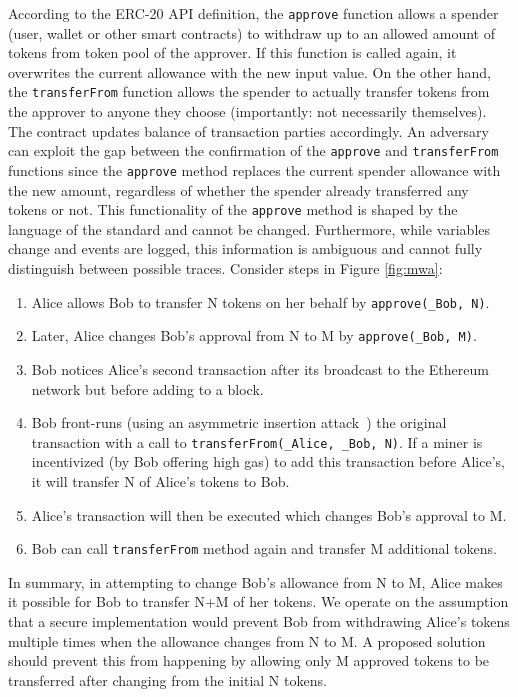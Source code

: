 According to the ERC-20 API definition, the \texttt{approve} function allows a spender (\eg user, wallet or other smart contracts) to withdraw up to an allowed amount of tokens from token pool of the approver. If this function is called again, it overwrites the current allowance with the new input value. On the other hand, the \texttt{transferFrom} function allows the spender to actually transfer tokens from the approver to anyone they choose (importantly: not necessarily themselves). The contract updates balance of transaction parties accordingly. An adversary can exploit the gap between the confirmation of the \texttt{approve} and \texttt{transferFrom} functions since the \texttt{approve} method replaces the current spender allowance with the new amount, regardless of whether the spender already transferred any tokens or not. This functionality of the \texttt{approve} method is shaped by the language of the standard and cannot be changed. Furthermore, while variables change and events are logged, this information is ambiguous and cannot fully distinguish between possible traces. Consider steps in Figure \ref{fig:mwa}:

\begin{enumerate}
	\item Alice allows Bob to transfer N tokens on her behalf by \texttt{approve(\_Bob, N)}.
	\item Later, Alice changes Bob's approval from N to M by \texttt{approve(\_Bob, M)}.
	\item Bob notices Alice's second transaction after its broadcast to the Ethereum network but before adding to a block.
	\item Bob front-runs (using an asymmetric insertion attack~\cite{eskandari2019sok}) the original transaction with a call to \texttt{transferFrom(\_Alice, \_Bob, N)}. If a miner is incentivized (\eg by Bob offering high gas) to add this transaction before Alice's, it will transfer N of Alice's tokens to Bob.
	\item Alice's transaction will then be executed which changes Bob's approval to M.
	\item Bob can call \texttt{transferFrom} method again and transfer M additional tokens.
\end{enumerate}
In summary, in attempting to change Bob's allowance from N to M, Alice makes it possible for Bob to transfer N+M of her tokens. We operate on the assumption that a secure implementation would prevent Bob from withdrawing Alice's tokens multiple times when the allowance changes from N to M. A proposed solution should prevent this from happening by allowing only M approved tokens to be transferred after changing from the initial N tokens.

